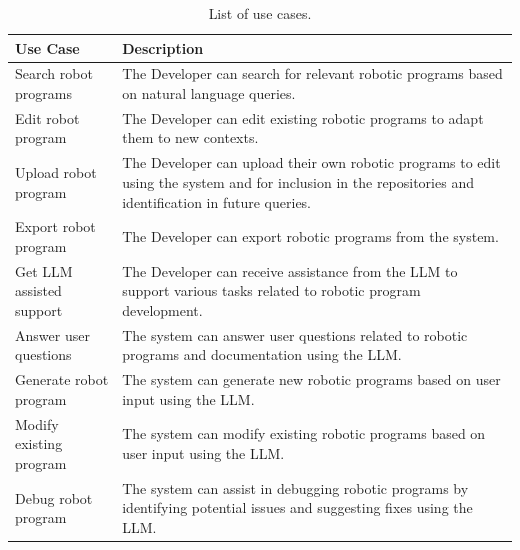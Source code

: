 \begin{table}[H]
    \centering
    \begin{tabular}{p{4cm}p{10cm}}
        \toprule
        \textbf{Use Case}        & \textbf{Description}                                                                                                                                     \\
        \midrule
        Search robot programs    & The Developer can search for relevant robotic programs based on natural language queries.                                                                \\
        Edit robot program       & The Developer can edit existing robotic programs to adapt them to new contexts.                                                                          \\
        Upload robot program     & The Developer can upload their own robotic programs to edit using the system and for inclusion in the repositories and identification in future queries. \\
        Export robot program     & The Developer can export robotic programs from the system.                                                                                               \\
        Get LLM assisted support & The Developer can receive assistance from the LLM to support various tasks related to robotic program development.                                       \\
        Answer user questions    & The system can answer user questions related to robotic programs and documentation using the LLM.                                                        \\
        Generate robot program   & The system can generate new robotic programs based on user input using the LLM.                                                                          \\
        Modify existing program  & The system can modify existing robotic programs based on user input using the LLM.                                                                       \\
        Debug robot program      & The system can assist in debugging robotic programs by identifying potential issues and suggesting fixes using the LLM.                                  \\
        \bottomrule
    \end{tabular}
    \caption{List of use cases.}
    \label{tab:requirement-engineering:use-cases}
\end{table}

